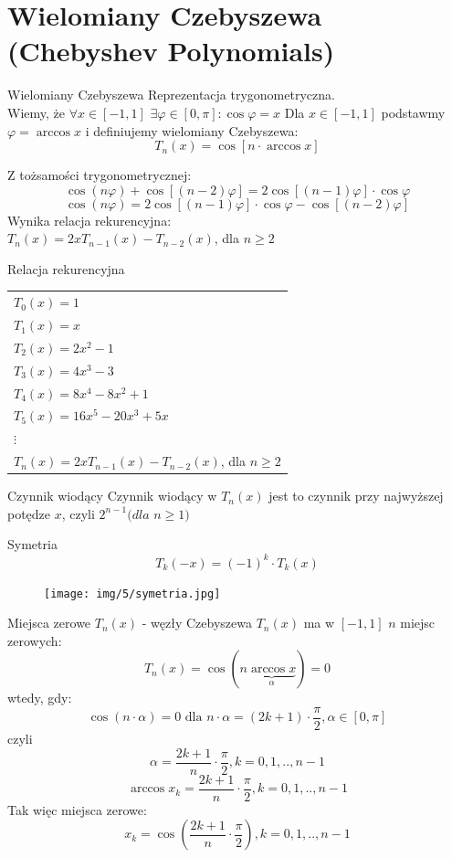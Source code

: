 \section{Wielomiany Czebyszewa (Chebyshev Polynomials)}
\begin{frame}{Wielomiany Czebyszewa}
    Reprezentacja trygonometryczna.\\
    Wiemy, że $\forall x \in [-1,1]$ $\exists \varphi \in [0,\pi]: \cos \varphi = x$ \newline
    Dla $x \in [-1,1]$ podstawmy $\varphi=\arccos x$ i definiujemy wielomiany Czebyszewa:
    $$T_n(x) = \cos[n \cdot \arccos x]$$
    
    Z tożsamości trygonometrycznej:
	$$\cos(n\varphi)+\cos[(n-2)\varphi] = 2\cos[(n-1)\varphi] \cdot \cos \varphi$$
    $$\cos(n\varphi) = 2\cos[(n-1)\varphi] \cdot \cos \varphi - \cos[(n-2)\varphi]$$
    Wynika relacja rekurencyjna:\\
    $T_n(x) = 2xT_{n-1}(x) - T_{n-2}(x)$, dla $n\geqslant2$
\end{frame}
\begin{frame}{Relacja rekurencyjna}
	\begin{tabular}{l}
		$T_0(x) = 1$ \\
        $T_1(x) = x$ \\
        $T_2(x) = 2x^2-1$ \\
        $T_3(x) = 4x^3-3$ \\
        $T_4(x) = 8x^4-8x^2+1$ \\
        $T_5(x) = 16x^5-20x^3+5x$ \\
        $\vdots$ \\
        $T_n(x) = 2xT_{n-1}(x) - T_{n-2}(x)$, dla $n\geqslant2$
	\end{tabular}
    
    \begin{block}{Czynnik wiodący}
    	Czynnik wiodący w $T_n(x)$ jest to czynnik przy najwyższej potędze $x$, czyli $2^{n-1} (dla$ $n\geqslant1)$
    \end{block}
\end{frame}
\begin{frame}{Symetria}
	$$T_k(-x)=(-1)^k \cdot T_k(x)$$
    \begin{figure}
		\texttt{[image: img/5/symetria.jpg]}
	\end{figure}
\end{frame}
\begin{frame}{Miejsca zerowe $T_n(x)$ - węzły Czebyszewa}
	$T_n(x)$ ma w $[-1,1]$ $n$ miejsc zerowych:
    $$T_n(x) = \cos(n \underbrace{\arccos x}_\alpha)=0$$ wtedy, gdy:
    $$\cos(n \cdot \alpha) = 0 \text{ dla } n \cdot \alpha = (2k+1) \cdot \frac{\pi}{2},  \alpha \in [0,\pi]$$ 
    czyli 
     $$ \alpha = \frac{2k+1}{n} \cdot \frac{\pi}{2},k=0,1,..,n-1$$
     $$ \arccos x_k = \frac{2k+1}{n} \cdot \frac{\pi}{2},k=0,1,..,n-1$$
     Tak więc miejsca zerowe:\\
     $$x_k = \cos (\frac{2k+1}{n} \cdot \frac{\pi}{2}), k=0,1,..,n-1$$
\end{frame}
